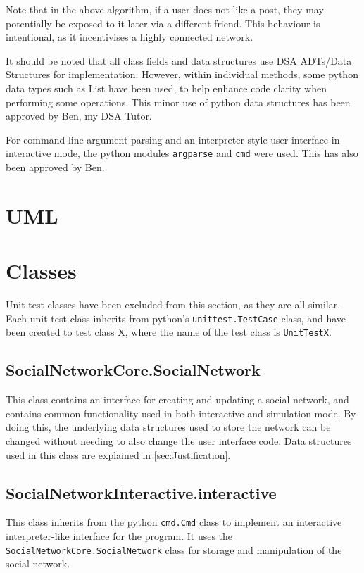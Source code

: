 \documentclass{article}
\begin{document}
Note that in the above algorithm, if a user does not like a post, they may potentially
be exposed to it later via a different friend. This behaviour is intentional, as it incentivises
a highly connected network.

It should be noted that all class fields and data structures use DSA
ADTs/Data Structures for implementation. However, within individual methods,
some python data types such as List have been used, to help enhance code clarity
when performing some operations. This minor use of python data structures
has been approved by Ben, my DSA Tutor.

For command line argument parsing and an interpreter-style user interface
in interactive mode, the python modules \texttt{argparse} and \texttt{cmd}
were used. This has also been approved by Ben.

\section{UML}



\section{Classes}

Unit test classes have been excluded from this section,
as they are all similar. Each unit test class inherits from python's \texttt{unittest.TestCase} class,
and have been created to test class X, where the name of the test class is
\texttt{UnitTestX}.

\subsection{SocialNetworkCore.SocialNetwork}
This class contains an interface for creating and updating a social network,
and contains common functionality used in both interactive and simulation mode.
By doing this, the underlying data structures used to store the network
can be changed without needing to also change the user interface code.
Data structures used in this class are explained in \autoref{sec:Justification}.

\subsection{SocialNetworkInteractive.interactive}
This class inherits from the python \texttt{cmd.Cmd} class
to implement an interactive interpreter-like interface for the program.
It uses the \texttt{SocialNetworkCore.SocialNetwork} class for storage and manipulation of the social network.
\end{document}
